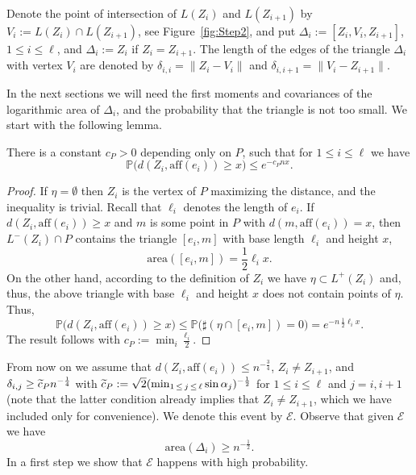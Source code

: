 \documentclass[AHL,Unicode,longabstracts,published]{cedram}
\newcommand{\bbP}{\mathbb{P}}
\newcommand{\clE}{\mathcal{E}}
\newcommand{\area}{\mathrm{area}}
\newcommand{\aff}{\mathrm{aff}}
\let\oldtilde\tilde
\renewcommand*{\tilde}[1]{\mathchoice{\widetilde{#1}}{\widetilde{#1}}{\oldtilde{#1}}{\oldtilde{#1}}}
\begin{document}
Denote the point of intersection of $L(Z_i)$ and $L(Z_{i+1})$ by $V_{i}:=L(Z_i)\cap L(Z_{i+1})$, see Figure~\ref{fig:Step2}, and put $\Delta_i:=[Z_i,V_{i},Z_{i+1}]$, $1\leq i\leq \ell$, and $\Delta_i := Z_i$ if $Z_i=Z_{i+1}$. The length of the edges of the triangle $\Delta_i$ with vertex $V_i$ are denoted by $\delta_{i,i}=\|Z_i-V_i\| $ and $\delta_{i,i+1}= \| V_i - Z_{i+1} \| $.

In the next sections we will need the first moments and covariances of the logarithmic area of $\Delta_i$, and the probability that the triangle is not too small. We start with the following lemma.

\begin{lemm}\label{lm:smalldistanceedge}
There is a constant $c_P>0$ depending only on $P$, such that for $1\leq i\leq \ell$ we have
\[
\bbP\big(d(Z_{i}, \aff(e_i)) \geq x\big) \leq e^{- c_P n x}.
\]
\end{lemm}

\begin{proof}
If $\eta=\emptyset$ then $Z_i$ is the vertex of $P$ maximizing the distance, and the inequality is trivial. Recall that $\ell_i$ denotes the length of $e_i$. If $d(Z_{i}, \aff(e_i)) \geq x $ and $m$ is some point in $P$ with $d(m, \aff(e_i)) = x $, then $L^-(Z_i) \cap P$ contains the triangle $[e_i, m]$ with base length $\ell_i$ and height $x$,
\[
{\area}([e_i, m]) = \frac 12 \ell_i x.
\]
On the other hand, according to the definition of $Z_i$ we have $\eta \subset L^+(Z_i)$ and, thus, the above triangle with base $\ell_i$ and height $x$ does not contain points of $\eta$. Thus,
\[
\bbP\big(d(Z_{i}, \aff(e_i)) \geq x\big) \leq
\bbP\big(\sharp (\eta \cap [e_i, m]) =0\big) = e^{- n \, \frac 12 \ell_i x }.
\]
The result follows with $c_P:= \min_i \frac{\ell_i}2 $.
\end{proof}

From now on we assume that $d(Z_i, \aff(e_i)) \leq n^{- \frac 34}$, $Z_i \neq Z_{i+1}$, and $\delta_{i,j} \geq \tilde c_P n^{- \frac 14}$ with $\tilde c_P:=\sqrt{2}(\min_{1\,\leq\,j\,\leq\,\ell} \sin \alpha_j)^{-\frac12}$ for $1\leq i\leq \ell$ and $j=i, i+1$ (note that the latter condition already implies that $Z_i\neq Z_{i+1}$, which we have included only for convenience). We denote this event by $\clE$. Observe that given $\clE$ we have
\begin{equation}\label{eq:Delta>n-12}
{\area}(\Delta_i) \geq n^{- \frac 12}.
\end{equation}
In a first step we show that $\clE$ happens with high probability.
\end{document}
